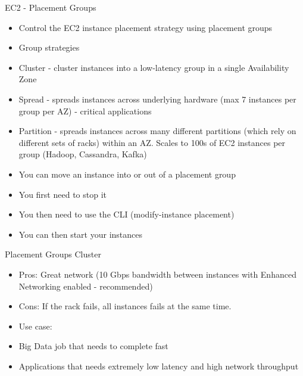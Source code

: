 EC2 - Placement Groups
\begin{itemize}
    \item Control the EC2 instance placement strategy using placement groups
    \item Group strategies
    \item Cluster - cluster instances into a low-latency group in a single Availability Zone
    \item Spread - spreads instances across underlying hardware (max 7 instances per group per AZ) - critical applications
    \item Partition - spreads instances across many different partitions (which rely on different sets of racks) within an AZ. Scales to 100s of EC2 instances per group (Hadoop, Cassandra, Kafka)
    \item You can move an instance into or out of a placement group
    \item You first need to stop it
    \item You then need to use the CLI (modify-instance placement)
    \item You can then start your instances
\end{itemize}

Placement Groups Cluster
\begin{itemize}
    \item Pros: Great network (10 Gbps bandwidth between instances with Enhanced Networking enabled - recommended)
    \item Cons: If the rack fails, all instances fails at the same time.
    \item Use case:
    \item Big Data job that needs to complete fast
    \item Applications that needs extremely low latency and high network throughput
\end{itemize}

